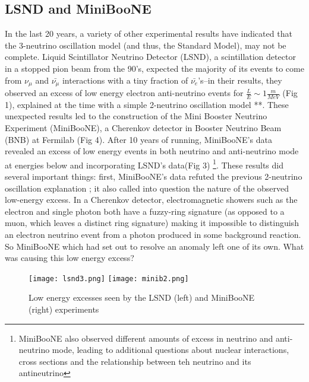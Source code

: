 \documentclass[12pt]{article}
\begin{document}
\subsection{LSND and MiniBooNE}
In the last 20 years, a variety of other experimental results have indicated that the 3-neutrino oscillation model (and thus, the Standard Model), may not be complete. Liquid Scintillator Neutrino Detector (LSND), a scintillation detector in a stopped pion beam from the 90's, expected the majority of its events to come from $\nu_\mu$ and $\bar{\nu_\mu}$ interactions with a tiny fraction of $\bar{\nu_e}$'s--in their results, they observed an excess of low energy electron anti-neutrino events for $\frac{L}{E} \sim 1 \frac{m}{MeV}$ (Fig 1), explained at the time with a simple 2-neutrino oscillation model \cite{lsnd}**. These unexpected results led to the construction of the Mini Booster Neutrino Experiment (MiniBooNE), a Cherenkov detector in Booster Neutrino Beam (BNB) at Fermilab (Fig 4). After 10 years of running, MiniBooNE's data revealed an excess of low energy events in both neutrino and anti-neutrino mode at energies below and incorporating LSND's data(Fig 3) \footnote{ MiniBooNE also observed different amounts of excess in neutrino and anti-neutrino mode, leading to additional questions about nuclear interactions, cross sections and the relationship between teh neutrino and its antineutrino\cite{miniboone}}.  These results did several important things: first, MiniBooNE's data refuted the previous 2-neutrino oscillation explanation \cite{miniboone}; it also called into question the nature of the observed low-energy excess. In a Cherenkov detector, electromagnetic showers such as the electron and single photon both have a fuzzy-ring signature (as opposed to a muon, which leaves a distinct ring signature) making it impossible to distinguish an electron neutrino event from a photon produced in some background reaction. So MiniBooNE which had set out to resolve an anomaly left one of its own. What was causing this low energy excess? 
\begin{figure}[h!]
\centering
\texttt{[image: lsnd3.png]}
\hspace{1.5 cm}
\texttt{[image: minib2.png]}
\caption{Low energy excesses seen by the LSND (left) and MiniBooNE (right) experiments}
\end{figure}


\newpage
\end{document}
